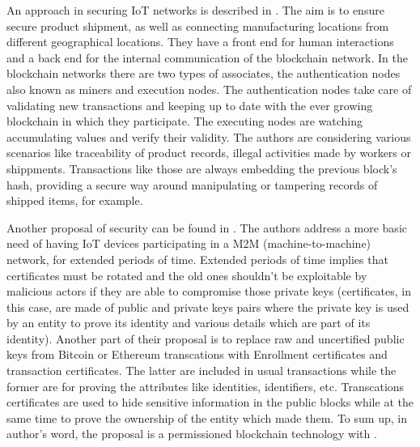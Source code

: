 \documentclass[a4paper,12pt,twoside]{book}
\begin{document}
    An approach in securing IoT networks is described in \cite{SecureCommunicatingThingsNetworkFramework}. The aim is to ensure secure product shipment, as well as connecting manufacturing locations from different geographical locations. They have a front end for human interactions and a back end for the internal communication of the blockchain network. In the blockchain networks there are two types of associates, the authentication nodes also known as miners and execution nodes. The authentication nodes take care of validating new transactions and keeping up to date with the ever growing blockchain in which they participate. The executing nodes are watching accumulating values and verify their validity. The authors are considering various scenarios like traceability of product records, illegal activities made by workers or shippments. Transactions like those are always embedding the previous block's hash, providing a secure way around manipulating or tampering records of shipped items, for example.

    Another proposal of security can be found in \cite{SecuringUserIdentity}. The authors address a more basic need of having IoT devices participating in a M2M (machine-to-machine) network, for extended periods of time. Extended periods of time implies that certificates must be rotated and the old ones shouldn't be exploitable by malicious actors if they are able to compromise those private keys (certificates, in this case, are made of public and private keys pairs where the private key is used by an entity to prove its identity and various details which are part of its identity). Another part of their proposal is to replace raw and uncertified public keys from Bitcoin or Ethereum transcations with Enrollment certificates and transaction certificates. The latter are included in usual transactions while the former are for proving the attributes like identities, identifiers, etc. Transcations certificates are used to hide sensitive information in the public blocks while at the same time to prove the ownership of the entity which made them. To sum up, in author's word, the proposal is a permissioned blockchain technology with .
\end{document}
